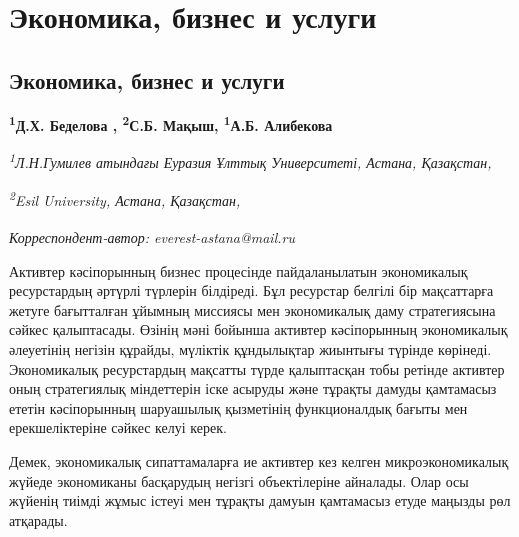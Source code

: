 \newpage
\let\cleardoublepage\clearpage
\part{Экономика, бизнес и услуги}
\let\cleardoublepage\clearpage
\chapter{Экономика, бизнес и услуги}

\begin{articleheader}

{\bfseries
\textsuperscript{1}Д.Х. Беделова\textsuperscript{\envelope } ,
\textsuperscript{2}С.Б. Мақыш,
\textsuperscript{1}А.Б. Алибекова}
\end{articleheader}

\begin{affiliation}
{\em \textsuperscript{1}Л.Н.Гумилев атындағы Еуразия Ұлттық Университеті, Астана, Қазақстан,}

{\em \textsuperscript{2}Esil University, Астана, Қазақстан,}

\raggedright \textsuperscript{\envelope }{\em Корреспондент-автор: everest-astana@mail.ru}
\end{affiliation}

Активтер кәсіпорынның бизнес процесінде пайдаланылатын экономикалық
ресурстардың әртүрлі түрлерін білдіреді. Бұл ресурстар белгілі бір
мақсаттарға жетуге бағытталған ұйымның миссиясы мен экономикалық даму
стратегиясына сәйкес қалыптасады. Өзінің мәні бойынша активтер
кәсіпорынның экономикалық әлеуетінің негізін құрайды, мүліктік
құндылықтар жиынтығы түрінде көрінеді. Экономикалық ресурстардың
мақсатты түрде қалыптасқан тобы ретінде активтер оның стратегиялық
міндеттерін іске асыруды және тұрақты дамуды қамтамасыз ететін
кәсіпорынның шаруашылық қызметінің функционалдық бағыты мен
ерекшеліктеріне сәйкес келуі керек.

Демек, экономикалық сипаттамаларға ие активтер кез келген
микроэкономикалық жүйеде экономиканы басқарудың негізгі объектілеріне
айналады. Олар осы жүйенің тиімді жұмыс істеуі мен тұрақты дамуын
қамтамасыз етуде маңызды рөл атқарады.

